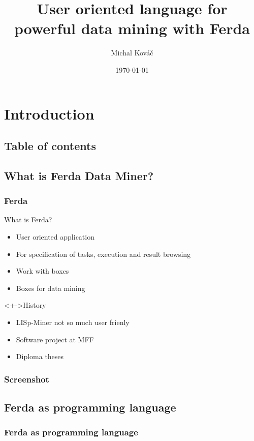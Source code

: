 \documentclass{beamer}
\author{Michal Kov\'{a}\v{c}}
\title{User oriented language for powerful data mining with Ferda}
\date{\today}
\begin{document}
\frame{\titlepage}

\section{Introduction}
\subsection{Table of contents}


\subsection{What is Ferda Data Miner?}
\begin{frame}
	\frametitle{Ferda}
	\begin{block}{What is Ferda?}
		\begin{itemize}[<+->]
			\item User oriented application
			\item For specification of tasks, execution and result browsing
			\item Work with boxes
			\item Boxes for data mining
		\end{itemize}
	\end{block}
	\begin{block}<+->{History}
		\begin{itemize}[<+->]
			\item LISp-Miner not so much user frienly
			\item Software project at MFF 
			\item Diploma theses
		\end{itemize}
	\end{block}
\end{frame}

\begin{frame}
	\frametitle{Screenshot}
\end{frame}

\subsection{Ferda as programming language}
\begin{frame}
	\frametitle{Ferda as programming language}
\end{frame}
\end{document}
